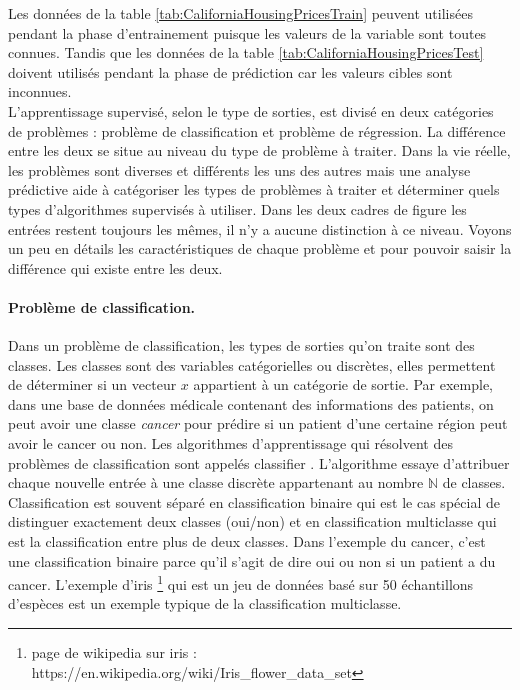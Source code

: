 \documentclass[12pt, french]{report}
\begin{document}
Les données de la table \ref{tab:CaliforniaHousingPricesTrain} peuvent utilisées pendant la phase d'entrainement puisque les valeurs de la variable sont toutes connues. Tandis que les données de la table \ref{tab:CaliforniaHousingPricesTest} doivent utilisés pendant la phase de prédiction car les valeurs cibles sont inconnues. \\

L'apprentissage supervisé, selon le type de sorties, est divisé en deux catégories de problèmes : problème de classification et problème de régression. La différence entre les deux se situe au niveau du type de problème à traiter. Dans la vie réelle, les problèmes sont diverses et différents les uns des autres mais une analyse prédictive aide à catégoriser les types de problèmes à traiter et déterminer quels types d'algorithmes supervisés à utiliser.  Dans les deux cadres de figure les entrées restent toujours les mêmes, il n'y a aucune distinction à ce niveau. Voyons un peu en détails les caractéristiques de chaque problème et pour pouvoir saisir la différence qui existe entre les deux.  

\paragraph{Problème de classification.} Dans un problème de classification, les types de sorties qu'on traite sont des classes. Les classes sont des variables catégorielles ou discrètes, elles permettent de déterminer si un vecteur $x$ appartient à un catégorie de sortie. Par exemple, dans une base de données médicale contenant des informations des patients, on peut avoir une classe  \guillemotleft \textit{cancer} \guillemotright pour prédire si un patient d'une certaine région peut avoir le cancer ou non. Les algorithmes d'apprentissage qui résolvent des problèmes de classification sont appelés  \guillemotleft classifier \guillemotright. L'algorithme essaye d'attribuer chaque nouvelle entrée à une classe discrète appartenant au nombre $\mathbb{N}$ de classes. Classification est souvent séparé en classification binaire qui est le cas spécial de distinguer exactement deux classes (oui/non) et en classification multiclasse qui est la classification entre plus de deux classes. Dans l'exemple du cancer, c'est une classification binaire parce qu'il s'agit de dire oui ou non si un patient a du cancer. L'exemple d'iris \footnote{page de wikipedia sur iris : https://en.wikipedia.org/wiki/Iris\_flower\_data\_set} qui est un jeu de données basé sur 50 échantillons d'espèces est un exemple typique de la classification multiclasse. \cite{key41, key42}
\end{document}
